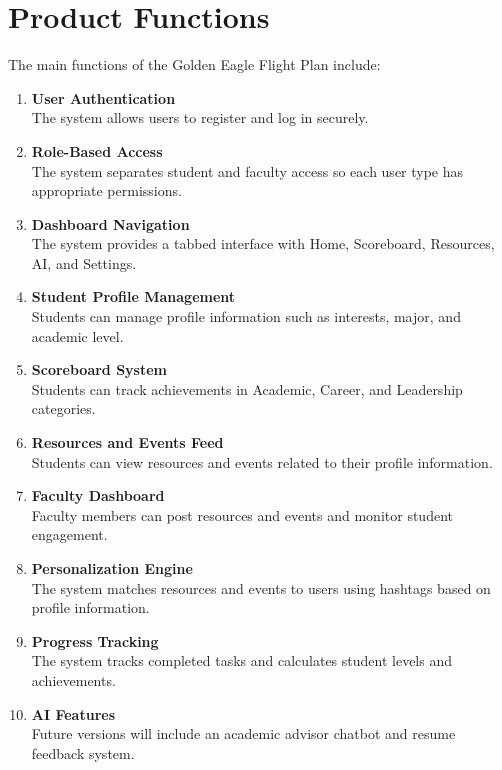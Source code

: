 \documentclass{scrreprt}
\begin{document}
\section{Product Functions}
The main functions of the Golden Eagle Flight Plan include:

\begin{enumerate}
    \item \textbf{User Authentication}\\
    The system allows users to register and log in securely.

    \item \textbf{Role-Based Access}\\
    The system separates student and faculty access so each user type has appropriate permissions.

    \item \textbf{Dashboard Navigation}\\
    The system provides a tabbed interface with Home, Scoreboard, Resources, AI, and Settings.

    \item \textbf{Student Profile Management}\\
    Students can manage profile information such as interests, major, and academic level.

    \item \textbf{Scoreboard System}\\
    Students can track achievements in Academic, Career, and Leadership categories.

    \item \textbf{Resources and Events Feed}\\
    Students can view resources and events related to their profile information.

    \item \textbf{Faculty Dashboard}\\
    Faculty members can post resources and events and monitor student engagement.

    \item \textbf{Personalization Engine}\\
    The system matches resources and events to users using hashtags based on profile information.

    \item \textbf{Progress Tracking}\\
    The system tracks completed tasks and calculates student levels and achievements.

    \item \textbf{AI Features}\\
    Future versions will include an academic advisor chatbot and resume feedback system.
\end{enumerate}
\end{document}
